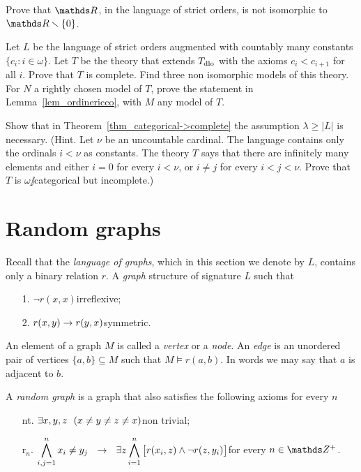 \documentclass[creche.tex]{subfiles}
\begin{document}
\begin{exercise}
Prove that $\RR$, in the language of strict orders, is not isomorphic to $\RR\sm\{0\}$.\QED
\end{exercise}

\begin{exercise}\label{VaughtEsempio3modelli}
Let $L$ be the language of strict orders augmented with countably many constants $\big\{c_i: i\in\omega\big\}$. Let $T$ be the theory that extends $T_{\rm dlo}$ with the axioms $c_i<c_{i+1}$ for all $i$. Prove that $T$ is complete. Find three non isomorphic models of this theory. For $N$ a rightly chosen model of $T$, prove the statement in Lemma~\ref{lem_ordinericco}, with $M$ any model of $T$.\QED
\end{exercise}


\begin{exercise}\label{categorica->completa}
Show that in Theorem~\ref{thm_categorical->complete} the assumption $\lambda\ge|L|$ is necessary. (Hint. Let $\nu$ be an uncountable cardinal. The language contains only the ordinals $i<\nu$ as constants. The theory $T$ says that there are infinitely many elements and either $i=0$ for every $i<\nu$, or $i\neq j$ for every $i<j<\nu$. Prove that $T$ is $\omega\jj$categorical but incomplete.)\QED
\end{exercise}


\section{Random graphs}
\label{randomgraph}

Recall that the \emph{language of graphs}, which in this section we denote by $L$, contains only a binary relation $r$. A \emph{graph\/} structure of signature $L$ such that

\begin{itemize}
\item[1.] $\neg r(x,x)$\hfill irreflexive;
\item[2.] $r(x,y)\rightarrow r(y,x)$\hfill symmetric.
\end{itemize}

An element of a graph $M$ is called a \emph{vertex\/} or a \emph{node}. An \emph{edge\/} is an unordered pair of vertices $\{a,b\}\subseteq M$ such that $M\models r(a,b)$. In words we may say that $a$ is adjacent to $b$.

A \emph{random graph\/} is a graph that also satisfies the following axioms for every $n$
\begin{itemize}
\item[nt.] $\exists x,y,z\ \ (x\neq y\neq z\neq x)$\hfill non trivial;
\item[r$_n$.] $\displaystyle\bigwedge^n_{i,j=1} x_i\neq y_j\ \ \imp\ \ \E z \bigwedge^n_{i=1} \big[r(x_i,z) \wedge \neg r(z,y_i)\big]$\hfill for every $n\in\ZZ^+$.
\end{itemize}
\end{document}
